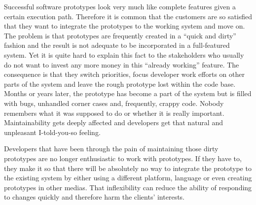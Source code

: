 \documentclass[lnbip]{svmultln}
\begin{document}
Successful software prototypes look very much like complete features
given a certain execution path. Therefore it is common that the
customers are so satisfied that they want to integrate the
prototypes to the working system and move on. The problem is that
prototypes are frequently created in a ``quick and dirty'' fashion and
the result is not adequate to be incorporated in a full-featured
system. Yet it is quite hard to explain this fact to the stakeholders
who usually do not want to invest any more money in this ``already
working'' feature. The consequence is that they switch priorities,
focus developer work efforts on other parts of the system and leave the rough
prototype lost within the code base. Months or years later, the
prototype has become a part of the system but is filled with bugs,
unhandled corner cases and, frequently, crappy code. Nobody remembers
what it was supposed to do or whether it is really
important. Maintainability gets deeply affected and developers get
that natural and unpleasant I-told-you-so feeling. %

Developers that have been through the pain of maintaining those dirty
prototypes are no longer enthusiastic to work with prototypes. If
they have to, they make it so that there will be absolutely no way to
integrate the prototype to the existing system by either using a
different platform, language or even creating prototypes in other
medias. That inflexibility can reduce the ability of responding to
changes quickly and therefore harm the clients' interests.
\end{document}
